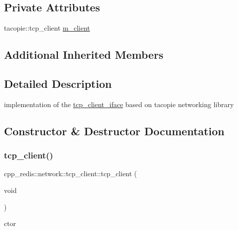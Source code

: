 \subsection*{Private Attributes}
\begin{DoxyCompactItemize}
\item 
tacopie\+::tcp\+\_\+client \hyperlink{classcpp__redis_1_1network_1_1tcp__client_a994cd8f0e7da2ebccd17ccb7cc0e1319}{m\+\_\+client}
\end{DoxyCompactItemize}
\subsection*{Additional Inherited Members}


\subsection{Detailed Description}
implementation of the \hyperlink{classcpp__redis_1_1network_1_1tcp__client__iface}{tcp\+\_\+client\+\_\+iface} based on tacopie networking library 

\subsection{Constructor \& Destructor Documentation}
\mbox{\label{classcpp__redis_1_1network_1_1tcp__client_a8cbad07ca636e9d60dafc0e5cac8106d}} 
\subsubsection{\texorpdfstring{tcp\+\_\+client()}{tcp\_client()}}
{\footnotesize\ttfamily cpp\+\_\+redis\+::network\+::tcp\+\_\+client\+::tcp\+\_\+client (\begin{DoxyParamCaption}\item[{void}]{ }\end{DoxyParamCaption})\hspace{0.3cm}{\ttfamily [default]}}



ctor 

\mbox{\label{classcpp__redis_1_1network_1_1tcp__client_af859036bbc7e5ec9149c1410a1a66f09}} 
